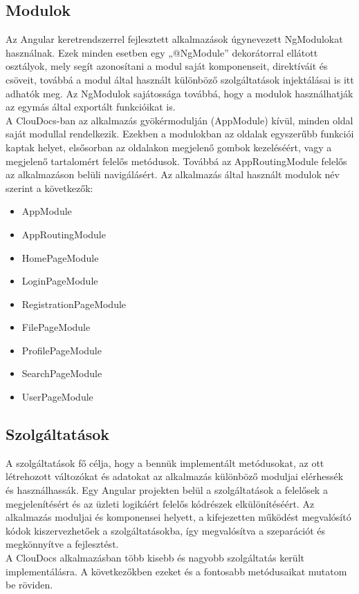 \documentclass[12pt]{report}
\begin{document}
\subsection{Modulok}
Az Angular keretrendszerrel fejlesztett alkalmazások úgynevezett NgModulokat használnak. Ezek minden esetben egy „@NgModule” dekorátorral ellátott osztályok, mely segít azonosítani a modul saját komponenseit, direktíváit és csöveit, továbbá a modul által használt különböző szolgáltatások injektálásai is itt adhatók meg. Az NgModulok sajátossága továbbá, hogy a modulok használhatják az egymás által exportált funkcióikat is.\\
A ClouDocs-ban az alkalmazás gyökérmodulján (AppModule) kívül, minden oldal saját modullal rendelkezik. Ezekben a modulokban az oldalak egyszerűbb funkciói kaptak helyet, elsősorban az oldalakon megjelenő gombok kezeléséért, vagy a megjelenő tartalomért felelős metódusok. Továbbá az AppRoutingModule felelős az alkalmazáson belüli navigálásért. Az alkalmazás által használt modulok név szerint a következők:
\begin{itemize}
	\item AppModule
	\item AppRoutingModule
	\item HomePageModule
	\item LoginPageModule
	\item RegistrationPageModule
	\item FilePageModule
	\item ProfilePageModule
	\item SearchPageModule
	\item UserPageModule
\end{itemize}

\subsection{Szolgáltatások}
A szolgáltatások fő célja, hogy a bennük implementált metódusokat, az ott létrehozott változókat és adatokat az alkalmazás különböző moduljai elérhessék és használhassák. Egy Angular projekten belül a szolgáltatások a felelősek a megjelenítésért és az üzleti logikáért felelős kódrészek elkülönítéséért. Az alkalmazás moduljai és komponensei helyett, a kifejezetten működést megvalósító kódok kiszervezhetőek a szolgáltatásokba, így megvalósítva a szeparációt és megkönnyítve a fejlesztést.\\
A ClouDocs alkalmazásban több kisebb és nagyobb szolgáltatás került implementálásra. A következőkben ezeket és a fontosabb metódusaikat mutatom be röviden.
\end{document}
